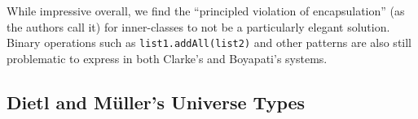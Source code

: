\documentclass{acm_proc_article-sp}
\begin{document}
While impressive overall, we find the ``principled violation of encapsulation''
(as the authors call it) for inner-classes to not be a particularly elegant
solution. Binary operations such as \linebreak\lstinline|list1.addAll(list2)|
and other patterns are also still problematic to express in both Clarke's and
Boyapati's systems.


%


\subsection{Dietl and M\"{u}ller's Universe Types}
\label{subsec:dietl}

%
%
%
%
\end{document}
